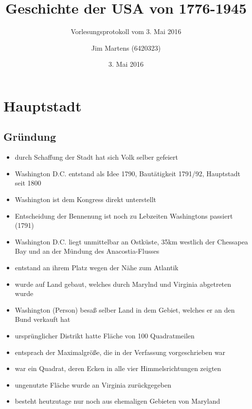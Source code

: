 \documentclass[10pt,a4paper,oneside,ngerman,numbers=noenddot]{scrartcl}
\newenvironment{myitemize}{\begin{itemize}\itemsep -9pt}{\end{itemize}} %
\begin{document}
\author{Jim Martens (6420323)}
\title{Geschichte der USA von 1776-1945}
\subtitle{Vorlesungsprotokoll vom 3. Mai 2016}
\date{3. Mai 2016}
\maketitle

\section*{Hauptstadt}

\subsection*{Gründung}
\begin{myitemize}
    \item durch Schaffung der Stadt hat sich Volk selber gefeiert
    \item Washington D.C. entstand als Idee 1790, Bautätigkeit 1791/92,
          Hauptstadt seit 1800
    \item Washington ist dem Kongress direkt unterstellt
    \item Entscheidung der Bennenung ist noch zu Lebzeiten Washingtons passiert (1791)
    \item Washington D.C. liegt unmittelbar an Ostküste, 35km westlich
          der Chessapea Bay und an der Mündung des Anacostia-Flusses
    \item entstand an ihrem Platz wegen der Nähe zum Atlantik
    \item wurde auf Land gebaut, welches durch Marylnd und Virginia abgetreten wurde
    \item Washington (Person) besaß selber Land in dem Gebiet, welches er an den Bund verkauft hat
    \item ursprünglicher Distrikt hatte Fläche von 100 Quadratmeilen
    \item entsprach der Maximalgröße, die in der Verfassung vorgeschrieben war
    \item war ein Quadrat, deren Ecken in alle vier Himmelsrichtungen zeigten
    \item ungenutzte Fläche wurde an Virginia zurückgegeben
    \item besteht heutzutage nur noch aus ehemaligen Gebieten von Maryland
\end{myitemize}
\end{document}
